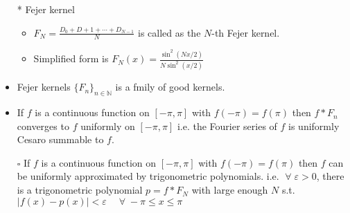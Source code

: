 \documentclass[12pt]{article}
\newcommand{\sq}{$\square$}
\newcommand{\N}{\mathbb{N}}
\newcommand{\forany}{\; \forall \;}
\begin{document}
\begin{itemize}
\begin{itemize}
    \end{itemize}
    \item[*] Fejer kernel 
    \begin{itemize}
        \item $F_N=\frac{D_0+D+1+\cdots+D_{N-1}}{N}$ is called as the $N$-th Fejer kernel.
        \item Simplified form is $F_N(x)=\frac{\sin^2(Nx/2)}{N\sin^2(x/2)}$
    \end{itemize} 
    \item Fejer kernels $\{F_n\}_{n\in \N}$ is a fmily of good kernels.
    \item If $f$ is a continuous function on $[-\pi, \pi]$ with $f(-\pi)=f(\pi)$ then $f*F_n$ converges to $f$ uniformly on $[-\pi, \pi]$ i.e. the Fourier series of $f$ is uniformly Cesaro summable to $f$.
    \item[\sq] If $f$ is a continuous function on $[-\pi, \pi]$ with $f(-\pi)=f(\pi)$ then $f$ can be uniformly approximated by trigonometric polynomials.\; i.e. $\forany \varepsilon>0$, there is a trigonometric polynomial $p=f*F_N$ with large enough $N$ s.t. $|f(x)-p(x)|<\varepsilon \quad \forany -\pi\leq x\leq \pi$
\end{itemize}
\smallskip
\end{document}
